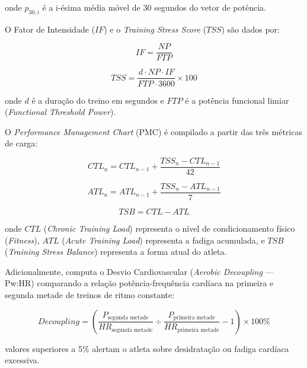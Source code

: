 \documentclass[
    a4paper,
    12pt,
    oneside,
    english,
    brazil,
    chapter=TITLE,
    section=TITLE,
]{abntex2}
\begin{document}
\noindent onde $p_{30,i}$ é a i-ésima média móvel de 30 segundos do vetor de potência.

O Fator de Intensidade ($IF$) e o \textit{Training Stress Score} ($TSS$) são dados por:

\begin{equation}\label{eq:if}
IF = \frac{NP}{FTP}
\end{equation}

\begin{equation}\label{eq:tss}
TSS = \frac{d \cdot NP \cdot IF}{FTP \cdot 3600} \times 100
\end{equation}

\noindent onde $d$ é a duração do treino em segundos e $FTP$ é a potência funcional limiar (\textit{Functional Threshold Power}).

O \textit{Performance Management Chart} (PMC) é compilado a partir das três métricas de carga:

\begin{equation}\label{eq:ctl}
CTL_{n} = CTL_{n-1} + \frac{TSS_n - CTL_{n-1}}{42}
\end{equation}

\begin{equation}\label{eq:atl}
ATL_{n} = ATL_{n-1} + \frac{TSS_n - ATL_{n-1}}{7}
\end{equation}

\begin{equation}\label{eq:tsb}
TSB = CTL - ATL
\end{equation}

\noindent onde $CTL$ (\textit{Chronic Training Load}) representa o nível de condicionamento físico (\textit{Fitness}), $ATL$ (\textit{Acute Training Load}) representa a fadiga acumulada, e $TSB$ (\textit{Training Stress Balance}) representa a forma atual do atleta.

Adicionalmente, computa o Desvio Cardiovascular (\textit{Aerobic Decoupling} --- Pw:HR) comparando a relação potência-frequência cardíaca na primeira e segunda metade de treinos de ritmo constante:

\begin{equation}\label{eq:decoupling}
Decoupling = \left( \frac{P_{\text{segunda metade}}}{HR_{\text{segunda metade}}} \div \frac{P_{\text{primeira metade}}}{HR_{\text{primeira metade}}} - 1 \right) \times 100\%
\end{equation}

\noindent valores superiores a 5\% alertam o atleta sobre desidratação ou fadiga cardíaca excessiva.
\end{document}
